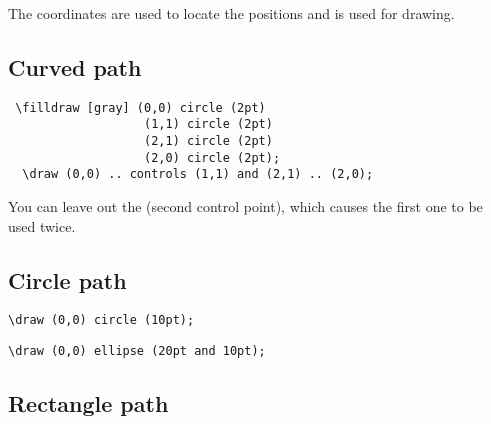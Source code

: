 
The coordinates are used to locate the positions and \keyword{--} is used for drawing.

\subsection{Curved path}
\label{sec:curved-path}

\begin{lstlisting}
 \filldraw [gray] (0,0) circle (2pt)
                   (1,1) circle (2pt)
                   (2,1) circle (2pt)
                   (2,0) circle (2pt);
  \draw (0,0) .. controls (1,1) and (2,1) .. (2,0);
\end{lstlisting}



You can leave out the  (second control point), which causes the first one to be used twice.



\subsection{Circle path}
\label{sec:circle-path}

\begin{lstlisting}
\draw (0,0) circle (10pt);
\end{lstlisting}




\begin{lstlisting}
\draw (0,0) ellipse (20pt and 10pt);
\end{lstlisting}


\subsection{Rectangle path}
\label{sec:rectangle-path}

